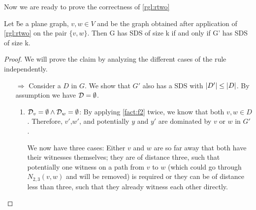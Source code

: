 
\noindent Now we are ready to prove the correctness of \cref{rgl:rtwo}
\begin{lemma}\label{lemma:correctnesstwo}
    Let \G be a plane graph, $v, w \in V$ and \GB be the graph obtained after application of \cref{rgl:rtwo} on the pair $\{v, w\}$. Then G has SDS of size k if and only if G' has SDS of size k.
\end{lemma}
\begin{proof}
    We will prove the claim by analyzing the different cases of the rule independently.     
    \begin{enumerate}
        \item[$\Rightarrow$] Consider a \sdom $D$ in $G$. We show that $G'$ also has a SDS with $\abs{D'} \leq \abs{D}$. By assumption we have $\mathcal{D} = \emptyset$.
        \begin{enumerate}
            \item  $ \mathcal{D}_{v} = \emptyset  \wedge \mathcal{D}_{w} = \emptyset $: By applying \cref{fact:f2} twice, we know that both  $v, w \in D$. Therefore, $v'$,$w'$, and potentially $y$ and $y'$ are dominated by $v$ or $w$ in $G'$.
            
            We now have three cases: Either $v$ and $w$ are so far away that both have their witnesses themselves; they are of distance three, such that potentially one witness on a path from $v$ to $w$ (which could go through $N_{2,3}(v,w)$ and will be removed) is required or they can be of distance less than three, such that they already witness each other directly. 


\end{enumerate}
\end{enumerate}
\end{proof}
